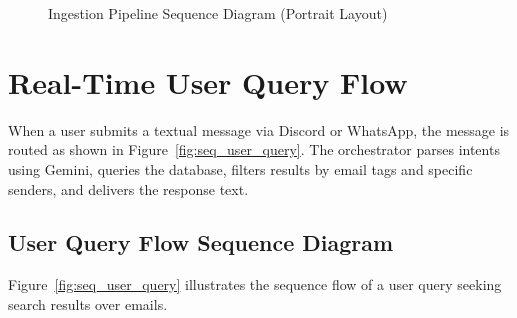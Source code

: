 \documentclass[12pt,a4paper]{report}
\begin{document}
\begin{figure}[htbp]
\caption{Ingestion Pipeline Sequence Diagram (Portrait Layout)}
\label{fig:seq_ingestion}
\end{figure}

\section{Real-Time User Query Flow}
When a user submits a textual message via Discord or WhatsApp, the message is routed as shown in Figure~\ref{fig:seq_user_query}. The orchestrator parses intents using Gemini, queries the database, filters results by email tags and specific senders, and delivers the response text.

\subsection{User Query Flow Sequence Diagram}
Figure~\ref{fig:seq_user_query} illustrates the sequence flow of a user query seeking search results over emails.
\end{document}
